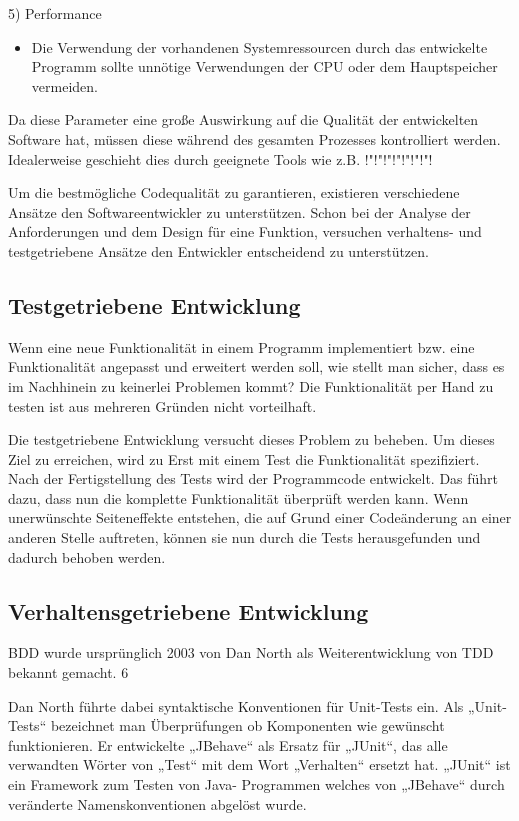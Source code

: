 5) Performance
\begin{itemize}	
	\item Die Verwendung der vorhandenen Systemressourcen durch das entwickelte Programm sollte unnötige Verwendungen der CPU oder dem Hauptspeicher vermeiden.
	
\end{itemize}

Da diese Parameter eine große Auswirkung auf die Qualität der entwickelten Software hat, müssen diese während des gesamten Prozesses kontrolliert werden. Idealerweise geschieht dies durch geeignete Tools wie z.B. !"!"!"!"!"!"!"!

Um die bestmögliche Codequalität zu garantieren, existieren verschiedene Ansätze den Softwareentwickler zu unterstützen. Schon bei der Analyse der Anforderungen und dem
Design für eine Funktion, versuchen verhaltens- und testgetriebene Ansätze den Entwickler entscheidend zu unterstützen.

\subsection{Testgetriebene Entwicklung}
Wenn eine neue Funktionalität in einem Programm implementiert bzw. eine Funktionalität angepasst und erweitert werden soll, wie stellt man sicher, dass es im Nachhinein
zu keinerlei Problemen kommt? Die Funktionalität per Hand zu testen ist aus mehreren Gründen nicht vorteilhaft.

Die testgetriebene Entwicklung versucht dieses Problem zu beheben. Um dieses Ziel zu erreichen, wird zu Erst mit einem Test die Funktionalität spezifiziert. Nach der
Fertigstellung des Tests wird der Programmcode entwickelt. Das führt dazu, dass nun die komplette Funktionalität überprüft werden kann. Wenn unerwünschte Seiteneffekte 
entstehen, die auf Grund einer Codeänderung an einer anderen Stelle auftreten, können sie nun durch die Tests herausgefunden und dadurch
behoben werden.

\subsection{Verhaltensgetriebene Entwicklung}
BDD wurde ursprünglich 2003 von Dan North als Weiterentwicklung von TDD bekannt gemacht. 6

Dan North führte dabei syntaktische Konventionen für Unit-Tests ein. Als „Unit-Tests“ bezeichnet man Überprüfungen ob Komponenten wie gewünscht funktionieren. Er
entwickelte „JBehave“ als Ersatz für „JUnit“, das alle verwandten Wörter von „Test“ mit dem Wort „Verhalten“ ersetzt hat. „JUnit“ ist ein Framework zum Testen von Java-
Programmen welches von „JBehave“ durch veränderte Namenskonventionen abgelöst wurde.

